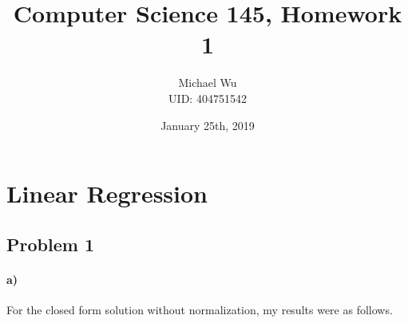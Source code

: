 \documentclass[12pt]{article}
\begin{document}
\title{Computer Science 145, Homework 1}
\date{January 25th, 2019}
\author{Michael Wu\\UID: 404751542}
\maketitle

\section{Linear Regression}

\subsection*{Problem 1}

\paragraph{a)}

For the closed form solution without normalization, my results were as follows.
\end{document}
